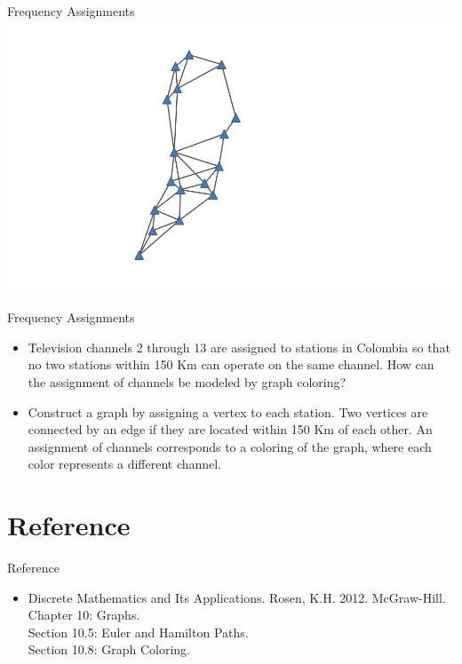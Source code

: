\documentclass{beamer}
\theoremstyle{definition}
\begin{document}
\begin{frame}{Frequency Assignments}
    \centering \includegraphics[width=.9\linewidth]{col4.png}
\end{frame}

\begin{frame}{Frequency Assignments}
    \begin{itemize}
        \item Television channels 2 through 13 are assigned to stations in Colombia so that no two stations within 150 Km can operate on the same channel. How can the assignment of channels be modeled by graph coloring?
        \item Construct a graph by assigning a vertex to each station. Two vertices are connected by an edge if they are located within 150 Km of each other. An assignment of channels corresponds to a coloring of the graph, where each color represents a different channel.
    \end{itemize}
\end{frame}

\section*{Reference}

\begin{frame}{Reference}
    \begin{itemize}
        \item Discrete Mathematics and Its Applications. Rosen, K.H. 2012. McGraw-Hill. \\
        Chapter 10: Graphs. \\
        Section 10.5: Euler and Hamilton Paths. \\
        Section 10.8: Graph Coloring.
    \end{itemize}
\end{frame}
\end{document}
